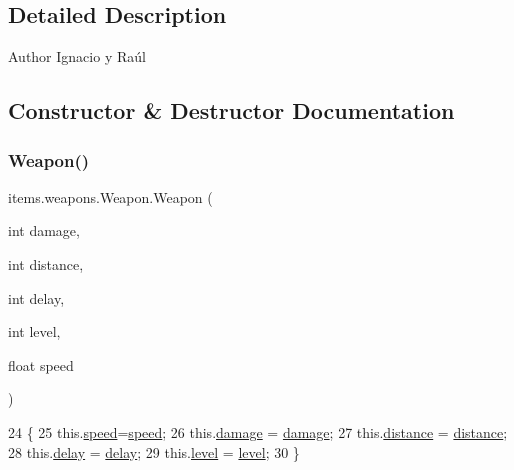 \subsection{Detailed Description}
\begin{DoxyAuthor}{Author}
Ignacio y Raúl 
\end{DoxyAuthor}


\subsection{Constructor \& Destructor Documentation}
\mbox{\label{classitems_1_1weapons_1_1_weapon_a00bbeeb9d5f57ed1f0c9a9013e353f42}} 
\subsubsection{\texorpdfstring{Weapon()}{Weapon()}}
{\footnotesize\ttfamily items.\+weapons.\+Weapon.\+Weapon (\begin{DoxyParamCaption}\item[{int}]{damage,  }\item[{int}]{distance,  }\item[{int}]{delay,  }\item[{int}]{level,  }\item[{float}]{speed }\end{DoxyParamCaption})\hspace{0.3cm}{\ttfamily [inline]}}


\begin{DoxyCode}
24                                                                                \{
25         this.\mbox{\hyperlink{classitems_1_1weapons_1_1_weapon_ac653ddf600cd6add7078dc32b5f1584a}{speed}}=\mbox{\hyperlink{classitems_1_1weapons_1_1_weapon_ac653ddf600cd6add7078dc32b5f1584a}{speed}};
26         this.\mbox{\hyperlink{classitems_1_1weapons_1_1_weapon_aa84d0aca66daedb3adb9209b6f2846a3}{damage}} = \mbox{\hyperlink{classitems_1_1weapons_1_1_weapon_aa84d0aca66daedb3adb9209b6f2846a3}{damage}};
27         this.\mbox{\hyperlink{classitems_1_1weapons_1_1_weapon_a125dc77704bbb1758d35f282802dcb8d}{distance}} = \mbox{\hyperlink{classitems_1_1weapons_1_1_weapon_a125dc77704bbb1758d35f282802dcb8d}{distance}};
28         this.\mbox{\hyperlink{classitems_1_1weapons_1_1_weapon_acf51fcf734c1ce98cbc6d1c2912e8058}{delay}} = \mbox{\hyperlink{classitems_1_1weapons_1_1_weapon_acf51fcf734c1ce98cbc6d1c2912e8058}{delay}};
29         this.\mbox{\hyperlink{classitems_1_1weapons_1_1_weapon_ae66ceb47ad12380ee5d39960606980b3}{level}} = \mbox{\hyperlink{classitems_1_1weapons_1_1_weapon_ae66ceb47ad12380ee5d39960606980b3}{level}};
30     \}
\end{DoxyCode}


